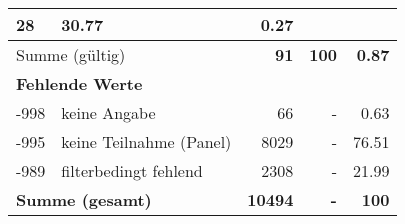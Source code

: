 \begin{longtable}{lXrrr}
       \num{28} &
       \num[round-mode=places,round-precision=2]{30,77} &
         \num[round-mode=places,round-precision=2]{0,27} \\
     \midrule
     \multicolumn{2}{l}{Summe (gültig)} &
       \textbf{\num{91}} &
     \textbf{100} &
       \textbf{\num[round-mode=places,round-precision=2]{0,87}} \\
     \multicolumn{5}{l}{\textbf{Fehlende Werte}}\\
       -998 &
       keine Angabe &
         \num{66} &
        - &
         \num[round-mode=places,round-precision=2]{0,63} \\
       -995 &
       keine Teilnahme (Panel) &
         \num{8029} &
        - &
         \num[round-mode=places,round-precision=2]{76,51} \\
       -989 &
       filterbedingt fehlend &
         \num{2308} &
        - &
         \num[round-mode=places,round-precision=2]{21,99} \\
     \midrule
     \multicolumn{2}{l}{\textbf{Summe (gesamt)}} &
          \textbf{\num{10494}} &
        \textbf{-} &
        \textbf{100} \\
     \bottomrule
     \end{longtable}
     
